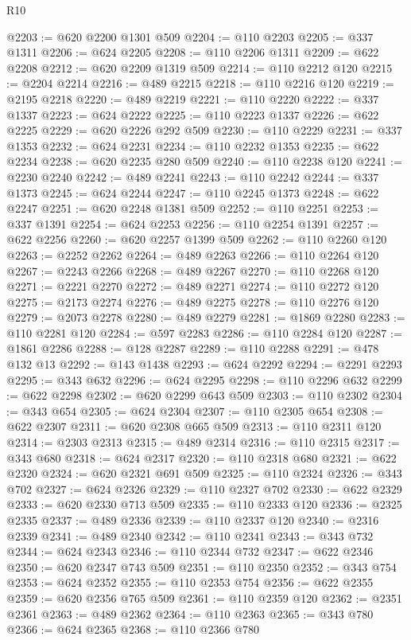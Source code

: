 \begin{lexlean}{R10}
\begin{coremodule}
{{{{{{{{{{{{{{{{{{{{{{{{{{{{{{{{{{{{{{{{{{{{{{{{{{{{{{{{{{{{{{{{{{{{{{{{{{{{{{{{{{{{@2203 := @620 @2200 @1301 @509
@2204 := @110 @2203
@2205 := @337 @1311
@2206 := @624 @2205
@2208 := @110 @2206 @1311
@2209 := @622 @2208
@2212 := @620 @2209 @1319 @509
@2214 := @110 @2212 @120
@2215 := @2204 @2214
@2216 := @489 @2215
@2218 := @110 @2216 @120
@2219 := @2195 @2218
@2220 := @489 @2219
@2221 := @110 @2220
@2222 := @337 @1337
@2223 := @624 @2222
@2225 := @110 @2223 @1337
@2226 := @622 @2225
@2229 := @620 @2226 @292 @509
@2230 := @110 @2229
@2231 := @337 @1353
@2232 := @624 @2231
@2234 := @110 @2232 @1353
@2235 := @622 @2234
@2238 := @620 @2235 @280 @509
@2240 := @110 @2238 @120
@2241 := @2230 @2240
@2242 := @489 @2241
@2243 := @110 @2242
@2244 := @337 @1373
@2245 := @624 @2244
@2247 := @110 @2245 @1373
@2248 := @622 @2247
@2251 := @620 @2248 @1381 @509
@2252 := @110 @2251
@2253 := @337 @1391
@2254 := @624 @2253
@2256 := @110 @2254 @1391
@2257 := @622 @2256
@2260 := @620 @2257 @1399 @509
@2262 := @110 @2260 @120
@2263 := @2252 @2262
@2264 := @489 @2263
@2266 := @110 @2264 @120
@2267 := @2243 @2266
@2268 := @489 @2267
@2270 := @110 @2268 @120
@2271 := @2221 @2270
@2272 := @489 @2271
@2274 := @110 @2272 @120
@2275 := @2173 @2274
@2276 := @489 @2275
@2278 := @110 @2276 @120
@2279 := @2073 @2278
@2280 := @489 @2279
@2281 := @1869 @2280
@2283 := @110 @2281 @120
@2284 := @597 @2283
@2286 := @110 @2284 @120
@2287 := @1861 @2286
@2288 := @128 @2287
@2289 := @110 @2288
@2291 := @478 @132 @13
@2292 := @143 @1438
@2293 := @624 @2292
@2294 := @2291 @2293
@2295 := @343 @632
@2296 := @624 @2295
@2298 := @110 @2296 @632
@2299 := @622 @2298
@2302 := @620 @2299 @643 @509
@2303 := @110 @2302
@2304 := @343 @654
@2305 := @624 @2304
@2307 := @110 @2305 @654
@2308 := @622 @2307
@2311 := @620 @2308 @665 @509
@2313 := @110 @2311 @120
@2314 := @2303 @2313
@2315 := @489 @2314
@2316 := @110 @2315
@2317 := @343 @680
@2318 := @624 @2317
@2320 := @110 @2318 @680
@2321 := @622 @2320
@2324 := @620 @2321 @691 @509
@2325 := @110 @2324
@2326 := @343 @702
@2327 := @624 @2326
@2329 := @110 @2327 @702
@2330 := @622 @2329
@2333 := @620 @2330 @713 @509
@2335 := @110 @2333 @120
@2336 := @2325 @2335
@2337 := @489 @2336
@2339 := @110 @2337 @120
@2340 := @2316 @2339
@2341 := @489 @2340
@2342 := @110 @2341
@2343 := @343 @732
@2344 := @624 @2343
@2346 := @110 @2344 @732
@2347 := @622 @2346
@2350 := @620 @2347 @743 @509
@2351 := @110 @2350
@2352 := @343 @754
@2353 := @624 @2352
@2355 := @110 @2353 @754
@2356 := @622 @2355
@2359 := @620 @2356 @765 @509
@2361 := @110 @2359 @120
@2362 := @2351 @2361
@2363 := @489 @2362
@2364 := @110 @2363
@2365 := @343 @780
@2366 := @624 @2365
@2368 := @110 @2366 @780
}}}}}}}}}}}}}}}}}}}}}}}}}}}}}}}}}}}}}}}}}}}}}}}}}}}}}}}}}}}}}}}}}}}}}}}}}}}}}}}}}}}}
\end{coremodule}
\end{lexlean}
